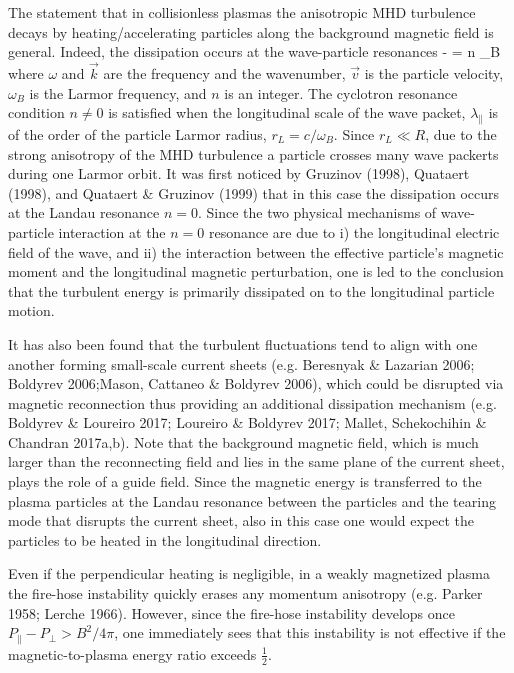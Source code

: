 \documentclass{aa}
\begin{document}
The statement that in collisionless plasmas the anisotropic MHD turbulence decays by heating/accelerating particles along the background magnetic field is general. 
Indeed, the dissipation occurs at the wave-particle resonances
\be
\omega -  \cdot {} = n \omega_B
\ee
where $\omega$ and $\vec{k}$ are the frequency and the wavenumber, $\vec{v}$ is the particle velocity, $\omega_B$ is the Larmor frequency, and $n$ is an integer.
The cyclotron resonance condition $n \ne 0$ is satisfied when the longitudinal scale of the wave packet, $\lambda_{\parallel}$ is of the order of the particle Larmor radius, $r_L = c/\omega_B$.
Since $r_L \ll R$, due to the strong anisotropy of the MHD turbulence a particle crosses many wave packerts during one Larmor orbit.
It was first noticed by Gruzinov (1998), Quataert (1998), and Quataert \& Gruzinov (1999) that in this case the dissipation occurs at the Landau resonance $n = 0$.
Since the two physical mechanisms of wave-particle interaction at the $n=0$ resonance are due to 
i) the longitudinal electric field of the wave, and
ii) the interaction between the effective particle's magnetic moment and the longitudinal magnetic perturbation, one is led to the conclusion that the turbulent energy is primarily dissipated on to the longitudinal particle motion.

It has also been found that the turbulent fluctuations tend to align with one another forming small-scale current sheets (e.g. Beresnyak \& Lazarian 2006; Boldyrev 2006;Mason, Cattaneo \& Boldyrev 2006), which could be disrupted via magnetic reconnection thus providing an additional dissipation mechanism (e.g. Boldyrev \& Loureiro 2017; Loureiro \& Boldyrev 2017; Mallet, Schekochihin \& Chandran 2017a,b). 
Note that the background magnetic field, which is much larger than the reconnecting field and lies in the same plane of the current sheet, plays the role of a guide field. 
Since the magnetic energy is transferred to the plasma particles at the Landau resonance between the particles and the tearing mode that disrupts the current sheet, also in this case one would expect the particles to be heated in the longitudinal direction.

Even if the perpendicular heating is negligible, in a weakly magnetized plasma the fire-hose instability quickly erases any momentum anisotropy (e.g. Parker 1958; Lerche 1966). 
However, since the fire-hose instability develops once $P_{\parallel} - P_{\perp} > B^2/4\pi$, one immediately sees that this instability is not effective if the magnetic-to-plasma energy ratio exceeds $\frac{1}{2}$.
\end{document}
